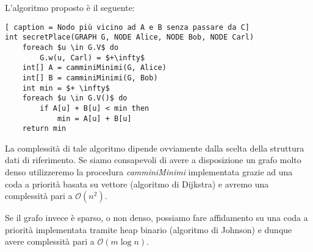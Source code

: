 \documentclass[../cheatSheetAlgoritmi.tex]{subfiles}
\begin{document}
L'algoritmo proposto è il seguente: 
\begin{lstlisting}[ caption = Nodo più vicino ad A e B senza passare da C]
int secretPlace(GRAPH G, NODE Alice, NODE Bob, NODE Carl)
	foreach $u \in G.V$ do
		G.w(u, Carl) = $+\infty$
	int[] A = camminiMinimi(G, Alice)
	int[] B = camminiMinimi(G, Bob)
	int min = $+ \infty$
	foreach $u \in G.V()$ do
		if A[u] + B[u] < min then
			min = A[u] + B[u]
	return min
\end{lstlisting}
La complessità di tale algoritmo dipende ovviamente dalla scelta della struttura dati di riferimento. Se siamo consapevoli di avere a disposizione un grafo molto denso utilizzeremo la procedura \emph{camminiMinimi} implementata grazie ad una coda a priorità basata su vettore (algoritmo di Dijkstra) e avremo una complessità pari a $\mathcal{O}(n^2)$. 

Se il grafo invece è sparso, o non denso, possiamo fare affidamento su una coda a priorità implementata tramite heap binario (algoritmo di Johnson) e dunque avere complessità pari a $\mathcal{O}(m \log n)$.
 
\end{document}
